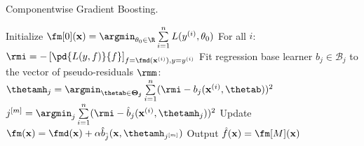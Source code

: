 
\begin{algorithm}[H]
  \begin{footnotesize}
  \begin{center}
  \caption{Componentwise Gradient Boosting.}\color{gray}
    \begin{algorithmic}[1]
      \State Initialize $\fm[0](\xv) = \argmin_{\theta_0\in\R} \sum  \limits_{i=1}^n L(\yi, \theta_0)$
        \State For all $i$: $\rmi = -\left[\pd{L(y, f)}{f}\right]_{f=\fmd(\xi),y=\yi}$
        \color{algocol}
          \State Fit regression base learner $b_j \in \mathcal{B}_j$ to the vector of pseudo-residuals $\rmm$:
          \State $\thetamh_j = \argmin_{\thetab \in \bm{\Theta_j}} \sum  \limits_{i=1}^n
          (\rmi - b_j(\xi, \thetab))^2$
        \EndFor
        \State $j^{[m]} = \argmin_{j} \sum  \limits_{i=1}^n (\rmi - \hat{b}_j(\xi, \thetamh_j))^2$
        \color{lightgray}
        \State Update $\fm(\xv) = \fmd(\xv) + \alpha \hat{b}_{\hat{j}}(\xv, \thetamh_{j^{[m]}})$
      \EndFor
      \State Output $\fh(\xv) = \fm[M](\xv)$
    \end{algorithmic}
    \end{center}
    \end{footnotesize}
    \color{black}
\end{algorithm}
